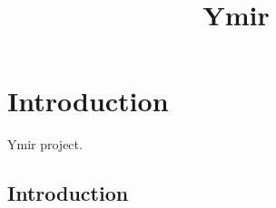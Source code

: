 






\title{Ymir}







\maketitle


\tableofcontents

\chapter*{Introduction}\label{chap-intro}

Ymir project.

\section{Introduction}\label{sec-introduction}
\cite{stacks-project}

\printbibliography

